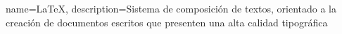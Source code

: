 
{
    name={\LaTeX},
    description={Sistema de composición de textos, orientado a la creación de documentos escritos que presenten una alta calidad tipográfica}
}
